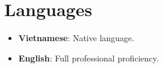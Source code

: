 \documentclass[letterpaper,11pt]{article}
\newcommand{\resumeSubHeadingListStart}{\begin{itemize}[leftmargin=*,label={}]}
\newcommand{\resumeSubHeadingListEnd}{\end{itemize}}
\begin{document}
\section{Languages}
  \resumeSubHeadingListStart
    \item{\textbf{Vietnamese}: Native language.}\\[-\baselineskip]
    \item{\textbf{English}: Full professional proficiency.}\\[-\baselineskip]
  \resumeSubHeadingListEnd
\end{document}
